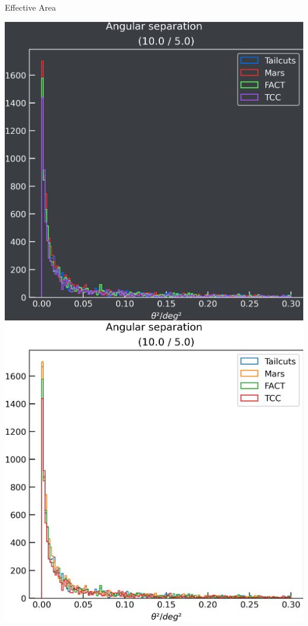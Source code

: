 \begin{frame}{Effective Area}
\begin{minipage}{0.32\textwidth}
    \fi
  \end{minipage}
  \begin{minipage}{0.32\textwidth}
    \ifdefined\darktheme
      \centering
      \includegraphics[width=\textwidth]{plots/ang_sep/ang_sep__10.0_5.0_dark.png}
    \else
      \centering
      \includegraphics[width=\textwidth]{plots/ang_sep/ang_sep__10.0_5.0_light.png}
    \fi
  \end{minipage}
\end{frame}

